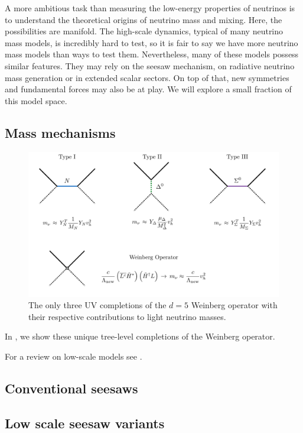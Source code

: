 A more ambitious task than measuring the low-energy properties of neutrinos is to understand the theoretical origins of neutrino mass and mixing. Here, the possibilities are manifold. The high-scale dynamics, typical of many neutrino mass models, is incredibly hard to test, so it is fair to say we have more neutrino mass models than ways to test them. Nevertheless, many of these models possess similar features. They may rely on the seesaw mechanism, on radiative neutrino mass generation or in extended scalar sectors. On top of that, new symmetries and fundamental forces may also be at play. We will explore a small fraction of this model space.

\subsection{Mass mechanisms}

\begin{figure}[t]
\centering
\includegraphics[width=\textwidth]{seesaw_mechanisms.pdf}
\caption[The tree-level UV completions of the Weinberg operator.]{The only three UV completions of the $d=5$ Weinberg operator with their respective contributions to light neutrino masses.\label{fig:seesaw_mechanisms}}
\end{figure}


In , we show these unique tree-level completions of the Weinberg operator.

For a review on low-scale models see \cite{Boucenna:2014zba}.

\subsection{Conventional seesaws}

\subsection{Low scale seesaw variants}

